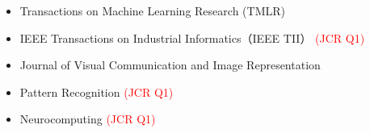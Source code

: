 \begin{itemize}
  \item Transactions on Machine Learning Research (TMLR)
  \item IEEE Transactions on Industrial Informatics（IEEE TII） \textcolor{red}{(JCR Q1)}
  \item Journal of Visual Communication and Image Representation
  \item Pattern Recognition \textcolor{red}{(JCR Q1)}
  \item Neurocomputing \textcolor{red}{(JCR Q1)}
\end{itemize}
